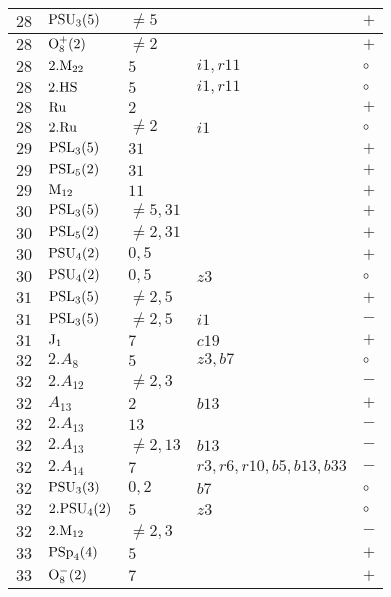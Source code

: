 \documentclass[a4paper, 11pt]{article}
\begin{document}
\begin{longtable}{lllll}
		$28$ & ${\rm PSU}_{3}(5)$ & $\neq 5$ & & $+$ \\ \hline
		$28$ & ${\rm O}_{8}^+(2)$ & $\neq 2$ & & $+$ \\ \hline
		$28$ & $2.{\rm M}_{22}$ & $5$ & $i1, r11$ & $\circ$ \\ \hline
		$28$ & $2.{\rm HS}$ & $5$ & $i1, r11$ & $\circ$ \\ \hline
		$28$ & ${\rm Ru}$ & $2$ & & $+$ \\ \hline
		$28$ & $2.{\rm Ru}$ & $\neq 2$ & $i1$ & $\circ$ \\ \hline
		$29$ & ${\rm PSL}_{3}(5)$ & $31$ & & $+$ \\ \hline
		$29$ & ${\rm PSL}_{5}(2)$ & $31$ & & $+$ \\ \hline
		$29$ & ${\rm M}_{12}$ & $11$ & & $+$ \\ \hline
		$30$ & ${\rm PSL}_{3}(5)$ & $\neq 5,31$ & & $+$ \\ \hline
		$30$ & ${\rm PSL}_{5}(2)$ & $\neq 2,31$ & & $+$ \\ \hline
		$30$ & ${\rm PSU}_{4}(2)$ & $0,5$ & & $+$ \\ \hline
		$30$ & ${\rm PSU}_{4}(2)$ & $0,5$ & $z3$ & $\circ$ \\ \hline
		$31$ & ${\rm PSL}_{3}(5)$ & $\neq 2,5$ & & $+$ \\ \hline
		$31$ & ${\rm PSL}_{3}(5)$ & $\neq 2,5$ & $i1$ & $-$ \\ \hline
		$31$ & ${\rm J}_1$ & $7$ & $c19$ & $+$ \\ \hline
		$32$ & $2.A_{8}$ & $5$ & $z3, b7$ & $\circ$ \\ \hline
		$32$ & $2.A_{12}$ & $\neq 2,3$ & & $-$ \\ \hline
		$32$ & $A_{13}$ & $2$ & $b13$ & $+$ \\ \hline
		$32$ & $2.A_{13}$ & $13$ & & $-$ \\ \hline
		$32$ & $2.A_{13}$ & $\neq 2,13$ & $b13$ & $-$ \\ \hline
		$32$ & $2.A_{14}$ & $7$ & $r3, r6, r10, b5, b13, b33$ & $-$ \\ \hline
		$32$ & ${\rm PSU}_{3}(3)$ & $0,2$ & $b7$ & $\circ$ \\ \hline
		$32$ & $2.{\rm PSU}_{4}(2)$ & $5$ & $z3$ & $\circ$ \\ \hline
		$32$ & $2.{\rm M}_{12}$ & $\neq 2,3$ & & $-$ \\ \hline
		$33$ & ${\rm PSp}_{4}(4)$ & $5$ & & $+$ \\ \hline
		$33$ & ${\rm O}_{8}^-(2)$ & $7$ & & $+$ \\ \hline

\end{longtable}
\end{document}
